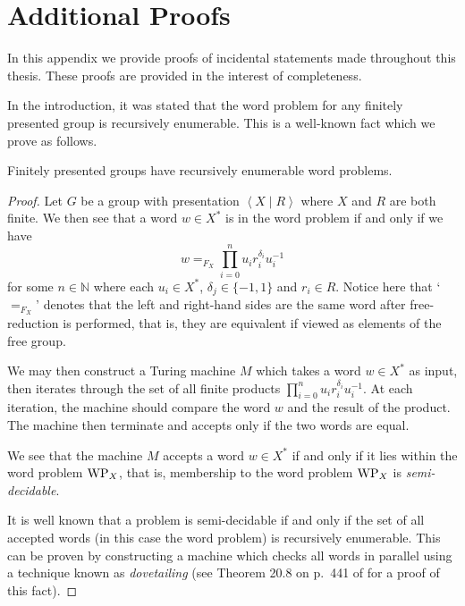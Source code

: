 \chapter{Additional Proofs}

In this appendix we provide proofs of incidental statements made throughout this thesis.
These proofs are provided in the interest of completeness.

In the introduction, it was stated that the word problem for any finitely presented group is recursively enumerable.
This is a well-known fact which we prove as follows.

\begin{proposition}\label{prop:appendix/wp-fp}
	Finitely presented groups have recursively enumerable word problems.
\end{proposition}

\begin{proof}
	Let $G$ be a group with presentation $\left\langle X \mid R \right\rangle$ where $X$ and $R$ are both finite.
	We then see that a word $w \in X^*$ is in the word problem if and only if we have
	\[
		w
		=_{F_X}
		\prod_{i=0}^n  u_i r_i^{\delta_i} u_i^{-1}
	\]
	for some $n \in \mathbb{N}$ where each $u_i \in X^*$, $\delta_j \in \{-1,1\}$ and $r_i \in R$.
	Notice here that `$=_{F_X}$' denotes that the left and right-hand sides are the same word after free-reduction is performed, that is, they are equivalent if viewed as elements of the free group.
	
	We may then construct a Turing machine $M$ which takes a word $w \in X^*$ as input, then iterates through the set of all finite products $\prod_{i=0}^n  u_i r_i^{\delta_i} u_i^{-1}$.
	At each iteration, the machine should compare the word $w$ and the result of the product.
	The machine then terminate and accepts only if the two words are equal.
	
	We see that the machine $M$ accepts a word $w \in X^*$ if and only if it lies within the word problem $\mathrm{WP}_X$, that is, membership to the word problem $\mathrm{WP}_X$ is \emph{semi-decidable}.
	
	It is well known that a problem is semi-decidable if and only if the set of all accepted words (in this case the word problem) is recursively enumerable.
	This can be proven by constructing a machine which checks all words in parallel using a technique known as \emph{dovetailing} (see Theorem 20.8 on p.~441 of \cite{rich2007} for a proof of this fact).
\end{proof}

